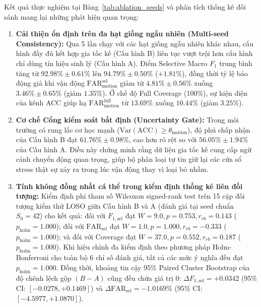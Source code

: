 \documentclass[conference]{IEEEtran}
\begin{document}
Kết quả thực nghiệm tại Bảng~\ref{tab:ablation_seeds} và phân tích thống kê đối sánh mang lại những phát hiện quan trọng:
\begin{enumerate}
    \item \textbf{Cải thiện ổn định trên đa hạt giống ngẫu nhiên (Multi-seed Consistency):} Qua 5 lần chạy với các hạt giống ngẫu nhiên khác nhau, cấu hình đầy đủ kết hợp gia tốc kế (Cấu hình B) liên tục vượt trội hơn cấu hình chỉ dùng tín hiệu sinh lý (Cấu hình A). Điểm Selective Macro $F_1$ trung bình tăng từ $92.98\% \pm 0.61\%$ lên $94.79\% \pm 0.50\%$ ($+1.81\%$), đồng thời tỷ lệ báo động giả khi vận động $\text{FAR}_{\text{motion}}^{\text{sel}}$ giảm từ $4.81\% \pm 0.56\%$ xuống $3.46\% \pm 0.65\%$ (giảm $1.35\%$). Ở chế độ Full Coverage (100\%), sự hiện diện của kênh ACC giúp hạ $\text{FAR}_{\text{motion}}^{\text{full}}$ từ $13.69\%$ xuống $10.44\%$ (giảm $3.25\%$).
    \item \textbf{Cơ chế Cổng kiểm soát bất định (Uncertainty Gate):} Trong môi trường có rung lắc cơ học mạnh ($\text{Var}(\text{ACC}) \ge \theta_{\text{motion}}$), độ phủ chấp nhận của Cấu hình B đạt $61.76\% \pm 0.98\%$, cao hơn rõ rệt so với $56.05\% \pm 1.94\%$ của Cấu hình A. Điều này chứng minh rằng dữ liệu gia tốc kế cung cấp ngữ cảnh chuyển động quan trọng, giúp bộ phân loại tự tin giữ lại các cửa sổ stress thật sự xảy ra trong lúc vận động thay vì loại bỏ nhầm.
    \item \textbf{Tính không đồng nhất cá thể trong kiểm định thống kê liên đối tượng:} Kiểm định phi tham số Wilcoxon signed-rank test trên 15 cặp đối tượng kiểm thử LOSO giữa Cấu hình B và A (đánh giá tại seed chuẩn $S_0=42$) cho kết quả: đối với $F_{1,\text{sel}}$ đạt $W = 9.0, p = 0.753, r_{rb} = 0.143$ ($p_{\text{holm}} = 1.000$); đối với $\text{FAR}_{\text{sel}}$ đạt $W = 1.0, p = 1.000, r_{rb} = -0.333$ ($p_{\text{holm}} = 1.000$); và đối với Coverage đạt $W = 37.0, p = 0.552, r_{rb} = 0.187$ ($p_{\text{holm}} = 1.000$). Khi hiệu chỉnh đa kiểm định theo phương pháp Holm-Bonferroni cho toàn bộ 6 chỉ số đánh giá, tất cả các mức ý nghĩa đều đạt $p_{\text{holm}} = 1.000$. Đồng thời, khoảng tin cậy 95\% Paired Cluster Bootstrap của độ chênh lệch gộp $(B - A)$ cũng đều chứa giá trị 0: $\Delta F_{1,\text{sel}} = +0.0342$ (95\% CI: $[-0.0278, +0.1469]$) và $\Delta \text{FAR}_{\text{sel}} = -1.0169\%$ (95\% CI: $[-4.5977, +1.0870]$). 


\end{enumerate}
\end{document}
